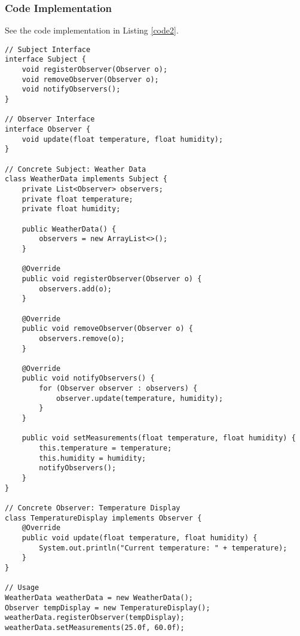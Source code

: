 \documentclass[11pt]{article}
\begin{document}
\subsubsection{Code Implementation}
See the code implementation in Listing \ref{code2}.
\begin{lstlisting}[caption=Code implementation of the weather monitoring system., label=code2]
// Subject Interface  
interface Subject {  
    void registerObserver(Observer o);  
    void removeObserver(Observer o);  
    void notifyObservers();  
}  

// Observer Interface  
interface Observer {  
    void update(float temperature, float humidity);  
}  

// Concrete Subject: Weather Data  
class WeatherData implements Subject {  
    private List<Observer> observers;  
    private float temperature;  
    private float humidity;  

    public WeatherData() {  
        observers = new ArrayList<>();  
    }  

    @Override  
    public void registerObserver(Observer o) {  
        observers.add(o);  
    }  

    @Override  
    public void removeObserver(Observer o) {  
        observers.remove(o);  
    }  

    @Override  
    public void notifyObservers() {  
        for (Observer observer : observers) {  
            observer.update(temperature, humidity);  
        }  
    }  

    public void setMeasurements(float temperature, float humidity) {  
        this.temperature = temperature;  
        this.humidity = humidity;  
        notifyObservers();  
    }  
}  

// Concrete Observer: Temperature Display  
class TemperatureDisplay implements Observer {  
    @Override  
    public void update(float temperature, float humidity) {  
        System.out.println("Current temperature: " + temperature);  
    }  
}  

// Usage  
WeatherData weatherData = new WeatherData();  
Observer tempDisplay = new TemperatureDisplay();  
weatherData.registerObserver(tempDisplay);  
weatherData.setMeasurements(25.0f, 60.0f);  
\end{lstlisting}
\end{document}
